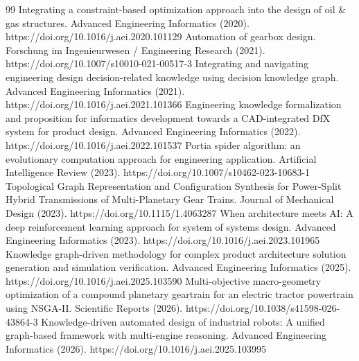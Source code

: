 \documentclass[preprint,12pt]{elsarticle}
\begin{document}
\begin{thebibliography}{99}
Integrating a constraint-based optimization approach into the design of oil \& gas structures. Advanced Engineering Informatics (2020). https://doi.org/10.1016/j.aei.2020.101129
Automation of gearbox design. Forschung im Ingenieurwesen / Engineering Research (2021). https://doi.org/10.1007/s10010-021-00517-3
Integrating and navigating engineering design decision-related knowledge using decision knowledge graph. Advanced Engineering Informatics (2021). https://doi.org/10.1016/j.aei.2021.101366
Engineering knowledge formalization and proposition for informatics development towards a CAD-integrated DfX system for product design. Advanced Engineering Informatics (2022). https://doi.org/10.1016/j.aei.2022.101537
Portia spider algorithm: an evolutionary computation approach for engineering application. Artificial Intelligence Review (2023). https://doi.org/10.1007/s10462-023-10683-1
Topological Graph Representation and Configuration Synthesis for Power-Split Hybrid Transmissions of Multi-Planetary Gear Trains. Journal of Mechanical Design (2023). https://doi.org/10.1115/1.4063287
When architecture meets AI: A deep reinforcement learning approach for system of systems design. Advanced Engineering Informatics (2023). https://doi.org/10.1016/j.aei.2023.101965
Knowledge graph-driven methodology for complex product architecture solution generation and simulation verification. Advanced Engineering Informatics (2025). https://doi.org/10.1016/j.aei.2025.103590
Multi-objective macro-geometry optimization of a compound planetary geartrain for an electric tractor powertrain using NSGA-II. Scientific Reports (2026). https://doi.org/10.1038/s41598-026-43864-3
Knowledge-driven automated design of industrial robots: A unified graph-based framework with multi-engine reasoning. Advanced Engineering Informatics (2026). https://doi.org/10.1016/j.aei.2025.103995
\end{thebibliography}
\end{document}
